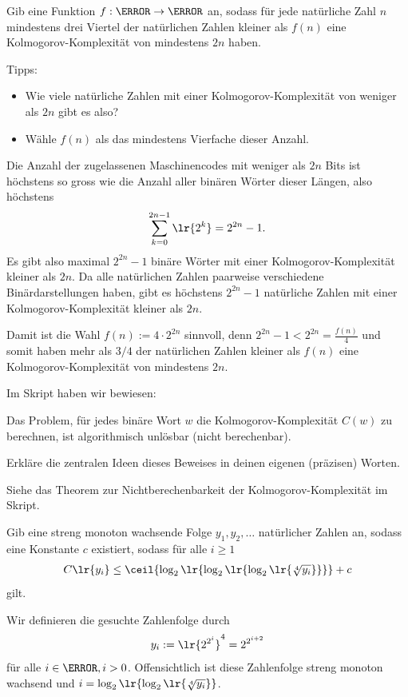 \begin{questions}
	\question[2] Gib eine Funktion $f: \N\to\N$ an, sodass für jede natürliche Zahl $n$ mindestens drei Viertel der natürlichen Zahlen kleiner als $f(n)$ eine Kolmogorov-Komplexität von mindestens $2n$ haben.

    Tipps:
    \begin{itemize}
        \item Wie viele natürliche Zahlen mit einer Kolmogorov-Komplexität von weniger als $2n$ gibt es also?
        \item Wähle $f(n)$ als das mindestens Vierfache dieser Anzahl.
    \end{itemize}
	\begin{solution}
		Die Anzahl der zugelassenen Maschinencodes mit weniger als $2n$ Bits ist höchstens so gross wie die Anzahl aller binären Wörter dieser Längen, also höchstens
		\begin{align*}
			\sum_{k = 0}^{2n-1}\lr{2^k} = 2^{2n} - 1.
		\end{align*}
		Es gibt also maximal $2^{2n} - 1$ binäre Wörter mit einer Kolmogorov-Komplexität kleiner als $2n$. Da alle natürlichen Zahlen paarweise verschiedene Binärdarstellungen haben, gibt es höchstens $2^{2n} - 1$ natürliche Zahlen mit einer Kolmogorov-Komplexität kleiner als $2n$.

		\vspace{\baselineskip}
		Damit ist die Wahl $f(n):= 4 \cdot 2^{2n}$ sinnvoll, denn $2^{2n} - 1 < 2^{2n} = \frac{f(n)}{4}$ und somit haben mehr als $3/4$ der natürlichen Zahlen kleiner als $f(n)$ eine Kolmogorov-Komplexität von mindestens $2n$.
	\end{solution}
	
	\question[2] Im Skript haben wir bewiesen:
	\begin{center}
        Das Problem, für jedes binäre Wort $w$ die Kolmogorov-Komplexität $C(w)$ zu berechnen, ist algorithmisch unlösbar (nicht berechenbar).
	\end{center}
    Erkläre die zentralen Ideen dieses Beweises in deinen eigenen (präzisen) Worten.
	\begin{solution}
		Siehe das Theorem zur Nichtberechenbarkeit der Kolmogorov-Komplexität im Skript.
	\end{solution}

	\question[2] Gib eine streng monoton wachsende Folge $y_1,y_2,\ldots$ natürlicher Zahlen an, sodass eine Konstante $c$ existiert, sodass für alle $i\geq 1$
	\begin{align*}
		C\lr{y_i} \leq \ceil{\log_2\lr{\log_2\lr{\log_2\lr{\sqrt[4]{y_i}}}}} + c
	\end{align*}
	gilt.
	\begin{solution}
		Wir definieren die gesuchte Zahlenfolge durch
		\begin{align*}
			y_i := \lr{2^{2^i}}^4 = 2^{2^{i+2}}
		\end{align*}
			für alle $i\in\N, i>0$. Offensichtlich ist diese Zahlenfolge streng monoton wachsend und $i = \log_2\lr{\log_2\lr{\sqrt[4]{y_i}}}$.


\end{solution}
\end{questions}
